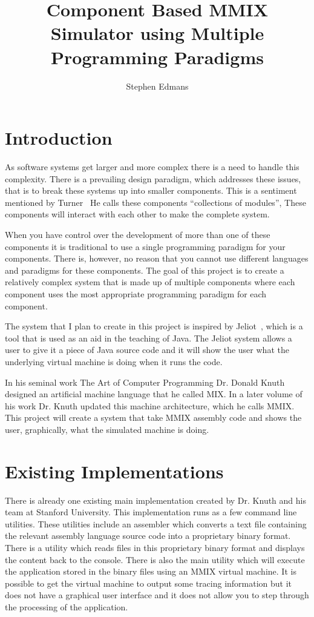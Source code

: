 \documentclass[11pt]{article} %
\title{Component Based MMIX Simulator using Multiple Programming Paradigms}
\author{Stephen Edmans}
\date{} %
\begin{document}
\maketitle
\newpage
\tableofcontents
\newpage
\listoffigures
\newpage
\section{Introduction}
As software systems get larger and more complex there is a need to handle this complexity. There is a prevailing design paradigm, which addresses these issues, that is to break these systems up into smaller components.  This is a sentiment mentioned by Turner~\cite{turner:why}  He calls these components ``collections of modules'', These components will interact with each other to make the complete system. 

When you have control over the development of more than one of these components it is traditional to use a single programming paradigm for your components. There is, however, no reason that you cannot use different languages and paradigms for these components. The goal of this project is to create a relatively complex system that is made up of multiple components where each component uses the most appropriate programming paradigm for each component.

The system that I plan to create in this project is inspired by Jeliot~\cite{jeliot:ref}, which is a tool that is used as an aid in the teaching of Java. The Jeliot system allows a user to give it a piece of Java source code and it will show the user what the underlying virtual machine is doing when it runs the code.

In his seminal work The Art of Computer Programming Dr. Donald Knuth designed an artificial machine language that he called MIX. In a later volume of his work Dr. Knuth updated this machine architecture, which he calls MMIX. This project will create a system that take MMIX assembly code and shows the user, graphically, what the simulated machine is doing.


\section{Existing Implementations}

There is already one existing main implementation created by Dr. Knuth and his team at Stanford University. This implementation runs as a few command line utilities.  These utilities include an assembler which converts a text file containing the relevant assembly language source code into a proprietary binary format.  There is a utility which reads files in this proprietary binary format and displays the content back to the console.  There is also the main utility which will execute the application stored in the binary files using an MMIX virtual machine.  It is possible to get the virtual machine to output some tracing information but it does not have a graphical user interface and it does not allow you to step through the processing of the application.  
\end{document}

